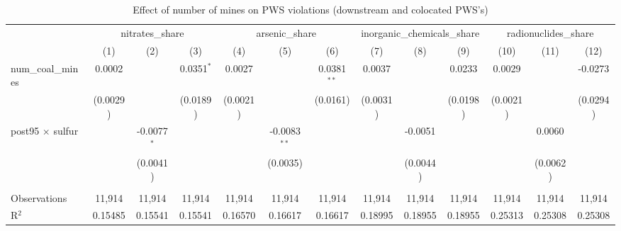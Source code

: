 
\begin{table}[htbp]
   \caption{\label{olsrf2sls_nummine_mine_vio_1985to2005dwnstrmcolocate} Effect of number of mines on PWS violations (downstream and colocated PWS's)}
   \bigskip
   \centering
   \begin{adjustbox}{width = \textwidth, center}
      \begin{tabular}{lcccccccccccc}
         \toprule
          & \multicolumn{3}{c}{nitrates\_share} & \multicolumn{3}{c}{arsenic\_share} & \multicolumn{3}{c}{inorganic\_chemicals\_share} & \multicolumn{3}{c}{radionuclides\_share}\\
                                                & (1)                   & (2)           & (3)           & (4)           & (5)            & (6)           & (7)           & (8)           & (9)           & (10)          & (11)          & (12)\\  
         \midrule 
         num\_coal\_mines                       & 0.0002                &               & 0.0351$^{*}$  & 0.0027        &                & 0.0381$^{**}$ & 0.0037        &               & 0.0233        & 0.0029        &               & -0.0273\\   
                                                & (0.0029)              &               & (0.0189)      & (0.0021)      &                & (0.0161)      & (0.0031)      &               & (0.0198)      & (0.0021)      &               & (0.0294)\\   
         post95 $\times$ sulfur                 &                       & -0.0077$^{*}$ &               &               & -0.0083$^{**}$ &               &               & -0.0051       &               &               & 0.0060        &   \\   
                                                &                       & (0.0041)      &               &               & (0.0035)       &               &               & (0.0044)      &               &               & (0.0062)      &   \\   
          \\
         Observations                           & 11,914                & 11,914        & 11,914        & 11,914        & 11,914         & 11,914        & 11,914        & 11,914        & 11,914        & 11,914        & 11,914        & 11,914\\  
         R$^2$                                  & 0.15485               & 0.15541       & 0.15541       & 0.16570       & 0.16617        & 0.16617       & 0.18995       & 0.18955       & 0.18955       & 0.25313       & 0.25308       & 0.25308\\  

\end{tabular}
\end{adjustbox}
\end{table}
